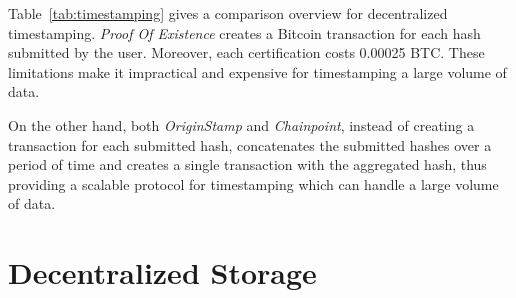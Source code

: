 		Table~\ref{tab:timestamping} gives a comparison overview for decentralized timestamping. \textit{Proof Of Existence} creates a Bitcoin transaction for each hash submitted by the user. Moreover, each certification costs 0.00025 BTC. These limitations make it impractical and expensive for timestamping a large volume of data. 
		
		On the other hand, both \textit{OriginStamp} and \textit{Chainpoint}, instead of creating a transaction for each submitted hash, concatenates the submitted hashes over a period of time and creates a single transaction with the aggregated hash, thus providing a scalable protocol for timestamping which can handle a large volume of data.
		
	\section{Decentralized Storage}
	
